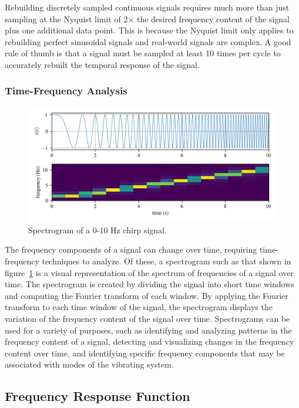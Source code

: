 \documentclass[12pt,letter]{article}
\begin{document}
Rebuilding discretely sampled continuous signals requires much more than just sampling at the Nyquist limit of 2$\times$ the desired frequency content of the signal plus one additional data point. This is because the Nyquist limit only applies to rebuilding perfect sinusoidal signals and real-world signals are complex. A good rule of thumb is that a signal must be sampled at least 10 times per cycle to accurately rebuilt the temporal response of the signal.

\subsubsection{Time-Frequency Analysis}


\begin{figure}[H]
    \centering
    \includegraphics[width=6.5in]{../figures/spectrogram.png}
    \caption{Spectrogram of a 0-10 Hz chirp signal.}
    \label{fig:spectrogram}
\end{figure}

The frequency components of a signal can change over time, requiring time-frequency techniques to analyze. Of these, a spectrogram such as that shown in figure~\ref{fig:spectrogram} is a visual representation of the spectrum of frequencies of a signal over time. The spectrogram is created by dividing the signal into short time windows and computing the Fourier transform of each window.  By applying the Fourier transform to each time window of the signal, the spectrogram displays the variation of the frequency content of the signal over time. Spectrograms can be used for a variety of purposes, such as identifying and analyzing patterns in the frequency content of a signal, detecting and visualizing changes in the frequency content over time, and identifying specific frequency components that may be associated with modes of the vibrating system.



\subsection{Frequency Response Function}
\end{document}
